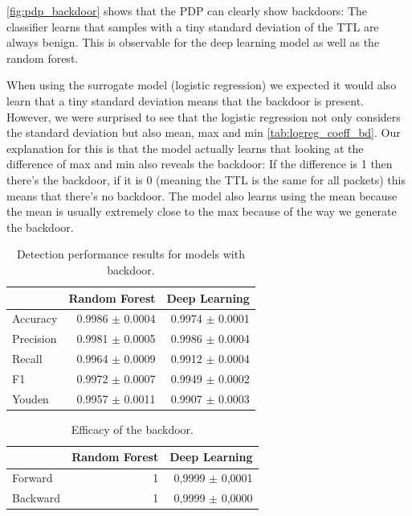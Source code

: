 \documentclass[sigconf,nonacm]{acmart}
\begin{document}
\autoref{fig:pdp_backdoor} shows that the PDP can clearly show backdoors: The classifier learns that samples with a tiny standard deviation of the TTL are always benign. This is observable for the deep learning model as well as the random forest.

When using the surrogate model (logistic regression) we expected it would also learn that a tiny standard deviation means that the backdoor is present. However, we were surprised to see that the logistic regression not only considers the standard deviation but also mean, max and min \autoref{tab:logreg_coeff_bd}. Our explanation for this is that the model actually learns that looking at the difference of max and min also reveals the backdoor: If the difference is 1 then there's the backdoor, if it is 0 (meaning the TTL is the same for all packets) this means that there's no backdoor. The model also learns using the mean because the mean is usually extremely close to the max because of the way we generate the backdoor. 

\begin{table}
\caption{Detection performance results for models with backdoor.} 
\label{tab:performance_results_bd}
\begin{tabular}{l r r} \toprule
& Random Forest & Deep Learning \\ \midrule
Accuracy	&	0.9986 $\pm$ 0.0004	&	0.9974 $\pm$ 0.0001		\\
Precision	&	0.9981 $\pm$ 0.0005	&	0.9986 $\pm$ 0.0004		\\
Recall	&	0.9964 $\pm$ 0.0009	&	0.9912 $\pm$ 0.0004		\\
F1	&	0.9972 $\pm$ 0.0007	&	0.9949 $\pm$ 0.0002		\\
Youden	&	0.9957 $\pm$ 0.0011	&	0.9907 $\pm$ 0.0003		\\
\bottomrule
\end{tabular}
\end{table}


\begin{table}
\caption{Efficacy of the backdoor.}
\begin{tabular}{l r r} \toprule
 & Random Forest & Deep Learning \\ \midrule
Forward & 1 & 0,9999 $\pm$ 0,0001 \\
Backward & 1 & 0,9999 $\pm$ 0,0000 \\
\bottomrule
\end{tabular}
\end{table}
\end{document}
